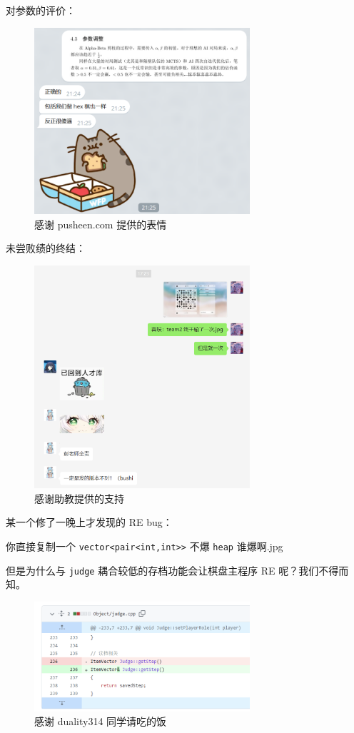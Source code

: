 \documentclass{noithesis}
\begin{document}
	对参数的评价：
	
	\begin{figure}[!htb]
		
		\centering
		\includegraphics[width=8cm]{img/ps2.png}
		
		\caption{感谢 pusheen.com 提供的表情}
	\end{figure}
	
	\newpage
	未尝败绩的终结：
	
	\begin{figure}[!htb]
		
		\centering
		\includegraphics[width=8cm]{img/ps3.png}
		
		\caption{感谢助教提供的支持}
	\end{figure}

	某一个修了一晚上才发现的 RE bug：
	
	你直接复制一个 \verb|vector<pair<int,int>>| 不爆 \verb|heap| 谁爆啊.jpg
	
	但是为什么与 \verb|judge| 耦合较低的存档功能会让棋盘主程序 RE 呢？我们不得而知。
	
	\begin{figure}[!htb]
	
	\centering
	\includegraphics[width=8cm]{img/ps4.png}
	
	\caption{感谢 duality314 同学请吃的饭}
	\end{figure}
\end{document}
